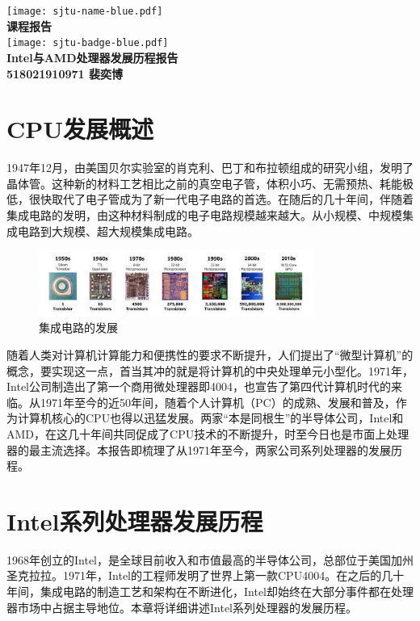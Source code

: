 \documentclass[UTF8]{ctexart}
\begin{document}
\begin{titlepage}
    \begin{center}
        \texttt{[image: sjtu-name-blue.pdf]}\\[1cm]
        \textsc{\Huge \bfseries 课程报告}\\[1.5cm]
        \texttt{[image: sjtu-badge-blue.pdf]}\\[0.5cm]

        \Huge \bfseries{Intel与AMD处理器发展历程报告}\\[1cm]
        \Large \bfseries{518021910971 裴奕博}
    \end{center}
\end{titlepage}

\tableofcontents
\newpage
\section{CPU发展概述}
1947年12月，由美国贝尔实验室的肖克利、巴丁和布拉顿组成的研究小组，发明了晶体管。这种新的材料工艺相比之前的真空电子管，体积小巧、无需预热、耗能极低，很快取代了电子管成为了新一代电子电路的首选。在随后的几十年间，伴随着集成电路的发明，由这种材料制成的电子电路规模越来越大。从小规模、中规模集成电路到大规模、超大规模集成电路。
\begin{figure}[H]
    \begin{center}
        \includegraphics[width=0.8\textwidth]{figure/ICdev.jpg}
        \caption{集成电路的发展}
    \end{center}
\end{figure}
随着人类对计算机计算能力和便携性的要求不断提升，人们提出了“微型计算机”的概念，要实现这一点，首当其冲的就是将计算机的中央处理单元小型化。1971年，Intel公司制造出了第一个商用微处理器即4004，也宣告了第四代计算机时代的来临。从1971年至今的近50年间，随着个人计算机（PC）的成熟、发展和普及，作为计算机核心的CPU也得以迅猛发展。两家“本是同根生”的半导体公司，Intel和AMD，在这几十年间共同促成了CPU技术的不断提升，时至今日也是市面上处理器的最主流选择。本报告即梳理了从1971年至今，两家公司系列处理器的发展历程。
\newpage
\section{Intel系列处理器发展历程}
1968年创立的Intel，是全球目前收入和市值最高的半导体公司，总部位于美国加州圣克拉拉。1971年，Intel的工程师发明了世界上第一款CPU4004。在之后的几十年间，集成电路的制造工艺和架构在不断进化，Intel却始终在大部分事件都在处理器市场中占据主导地位。本章将详细讲述Intel系列处理器的发展历程。
\end{document}

